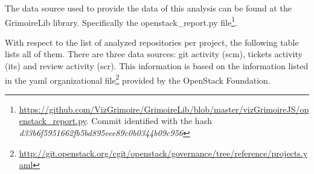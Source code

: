 \documentclass[a4wide,11pt]{report}
\begin{document}
The data source used to provide the data of this analysis can be found at the GrimoireLib library. Specifically the openstack\_report.py file\footnote{\url{https://github.com/VizGrimoire/GrimoireLib/blob/master/vizGrimoireJS/openstack_report.py}. Commit identified with the hash \emph{d33b6f5951662fb5bd895eee89c0b0344b09c956}}. 


With respect to the list of analyzed repositories per project, the following table lists all of them.
There are three data sources: git activity (scm), tickets activity (its) and review activity (scr). This information is based on the information listed in the yaml organizational file\footnote{\url{http://git.openstack.org/cgit/openstack/governance/tree/reference/projects.yaml}} provided by the OpenStack Foundation.



\end{document}
